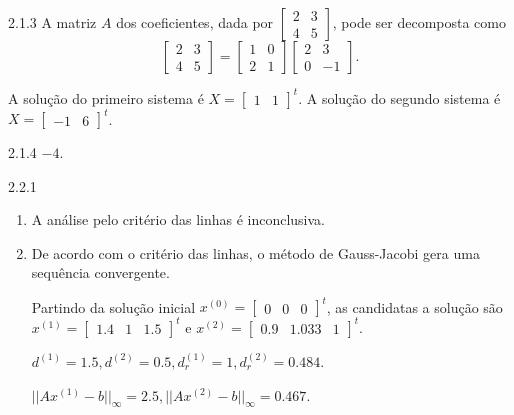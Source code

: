 \begin{Solucao}{2.1.3}
A matriz $A$ dos coeficientes, dada por $\begin{bmatrix}
2&3\\4&5
\end{bmatrix}$, pode ser decomposta como
$$\begin{bmatrix}
2&3\\4&5
\end{bmatrix}=\begin{bmatrix}
1&0\\2&1
\end{bmatrix}\begin{bmatrix}
2&3\\0&-1
\end{bmatrix}.$$

A solução do primeiro sistema é $X=\begin{bmatrix}
1&1
\end{bmatrix}^t$. A solução do segundo sistema é $X=\begin{bmatrix}
-1&6
\end{bmatrix}^t$.
\end{Solucao}
\begin{Solucao}{2.1.4}
$-4$.
\end{Solucao}
\begin{Solucao}{2.2.1}
\begin{enumerate}
\item A análise pelo critério das linhas é inconclusiva.
\item De acordo com o critério das linhas, o método de Gauss-Jacobi gera uma sequência convergente.


Partindo da solução inicial $x^{(0)}=\begin{bmatrix}
0&0&0
\end{bmatrix}^t$, as candidatas a solução são $x^{(1)}=\begin{bmatrix}
1.4&1&1.5
\end{bmatrix}^t$ e $x^{(2)}=\begin{bmatrix}
0.9&1.033&1
\end{bmatrix}^t$.

$d^{(1)}=1.5, d^{(2)}=0.5, d_r^{(1)}=1,d_r^{(2)}=0.484$.

$||Ax^{(1)}-b||_\infty=2.5, ||Ax^{(2)}-b||_\infty=0.467$.
\end{enumerate}

\end{Solucao}
